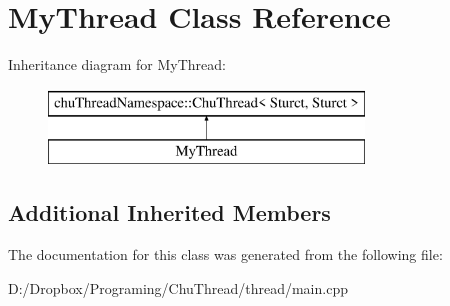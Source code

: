 \hypertarget{class_my_thread}{\section{My\-Thread Class Reference}
\label{class_my_thread}
}
Inheritance diagram for My\-Thread\-:\begin{figure}[H]
\begin{center}
\leavevmode
\includegraphics[height=2.000000cm]{class_my_thread}
\end{center}
\end{figure}
\subsection*{Additional Inherited Members}


The documentation for this class was generated from the following file\-:\begin{DoxyCompactItemize}
\item 
D\-:/\-Dropbox/\-Programing/\-Chu\-Thread/thread/main.\-cpp\end{DoxyCompactItemize}
